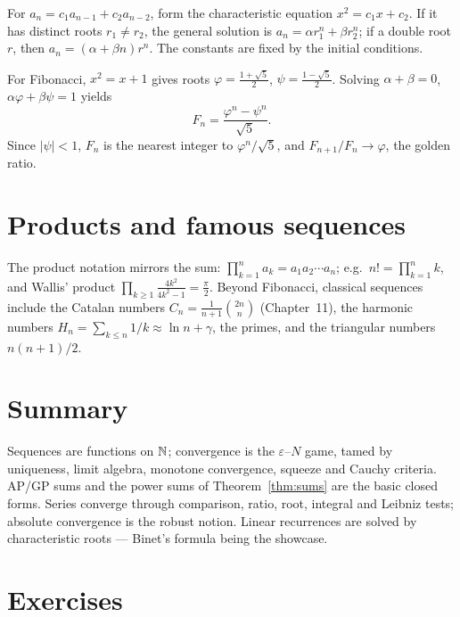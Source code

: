 \begin{theorem}\label{thm:rec}
For $a_n = c_1 a_{n-1} + c_2 a_{n-2}$, form the characteristic equation
$x^2 = c_1 x + c_2$.
If it has distinct roots $r_1 \neq r_2$, the general solution is
$a_n = \alpha r_1^{n} + \beta r_2^{n}$;
if a double root $r$, then $a_n = (\alpha + \beta n) r^{n}$. The constants
are fixed by the initial conditions.
\end{theorem}

\begin{example}\label{ex:binet}
For Fibonacci, $x^2 = x + 1$ gives roots
$\varphi = \frac{1+\sqrt5}{2}$, $\psi = \frac{1-\sqrt5}{2}$. Solving
$\alpha + \beta = 0$, $\alpha\varphi + \beta\psi = 1$ yields
\[
F_n = \frac{\varphi^{n} - \psi^{n}}{\sqrt 5}.
\]
Since $|\psi| < 1$, $F_n$ is the nearest integer to
$\varphi^{n}/\sqrt5$, and $F_{n+1}/F_n \to \varphi$, the golden ratio.
\end{example}

\section{Products and famous sequences}

The product notation mirrors the sum:
$\prod_{k=1}^{n} a_k = a_1 a_2 \cdots a_n$; e.g.\
$n! = \prod_{k=1}^{n} k$, and Wallis' product
$\prod_{k\ge1} \frac{4k^2}{4k^2-1} = \frac{\pi}{2}$.
Beyond Fibonacci, classical sequences include the Catalan numbers
$C_n = \frac{1}{n+1}\binom{2n}{n}$ (Chapter~11), the harmonic numbers
$H_n = \sum_{k\le n} 1/k \approx \ln n + \gamma$, the primes, and the
triangular numbers $n(n+1)/2$.

\section{Summary}

Sequences are functions on $\mathbb{N}$; convergence is the $\varepsilon$--$N$ game,
tamed by uniqueness, limit algebra, monotone convergence, squeeze and Cauchy
criteria. AP/GP sums and the power sums of Theorem~\ref{thm:sums} are the
basic closed forms. Series converge through comparison, ratio, root,
integral and Leibniz tests; absolute convergence is the robust notion. Linear
recurrences are solved by characteristic roots --- Binet's formula being the
showcase.

\section*{Exercises}

